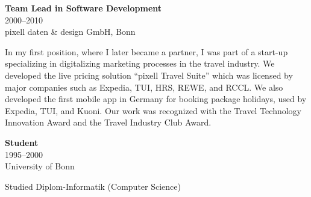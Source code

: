\documentclass[a4paper,10pt]{article}
\newcommand{\experience}[4]{
  \begin{adjustbox}{}
    \begin{minipage}[t]{0.25\textwidth}
      \textbf{\color{sectionblue}#1} \\
      {\color{sectiongray}#2} \\
      #3\\
    \end{minipage}
    \hspace{1em}
    \begin{minipage}[t]{0.75\textwidth}
      #4\\
    \end{minipage}
  \end{adjustbox}
}
\begin{document}
  \vspace{1em}{\color{sectionblue}\rule{\textwidth}{0.4pt}}\vspace{1em}

  \experience
  {Team Lead in Software Development}
  {2000–2010}
  {pixell daten \& design GmbH, Bonn}
  {In my first position, where I later became a partner, I was part of a start-up specializing in digitalizing marketing processes in the travel industry. We developed the live pricing solution \enquote{pixell Travel Suite} which was licensed by major companies such as Expedia, TUI, HRS, REWE, and RCCL. We also developed the first mobile app in Germany for booking package holidays, used by Expedia, TUI, and Kuoni. Our work was recognized with the Travel Technology Innovation Award and the Travel Industry Club Award.}

  \vspace{1em}{\color{sectionblue}\rule{\textwidth}{0.4pt}}\vspace{1em}

  \experience
  {Student}
  {1995–2000}
  {University of Bonn}
  {Studied Diplom-Informatik (Computer Science)}
\end{document}
